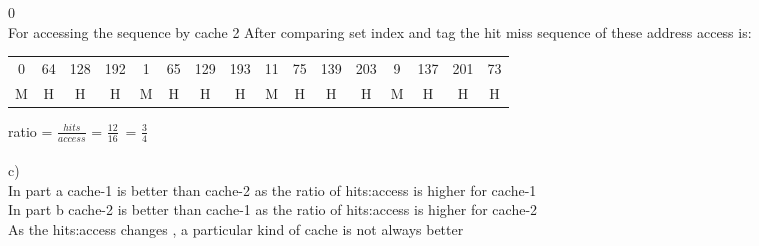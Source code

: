 \documentclass[12pt]{article}
\begin{document}
0     \\
For accessing the sequence by cache 2
After comparing set index and tag the hit miss sequence of these address access is:\\
\begin{center}
	\begin{tabular}{ |c|c|c|c|c|c|c|c|c|c|c|c|c|c|c|c| } 
		\hline
		0&64&128&192&1&65&129&193&11&75&139&203&9&137&201&73 \\ 
		
		M&H&H&H&M&H&H&H&M&H&H&H&M&H&H&H \\  
		\hline
	\end{tabular}
\end{center}
ratio  =
\(\frac{hits}{access}\) =
\(\frac{12}{16}\)\      =
\(\frac{3}{4}\)\    \\\\
c)\\
In part a cache-1 is better than cache-2 as the ratio of hits:access is higher for cache-1\\
In part b cache-2 is better than cache-1 as the ratio of hits:access is higher for cache-2\\
As the hits:access changes , a particular kind of cache is not always better\\
\end{document}
